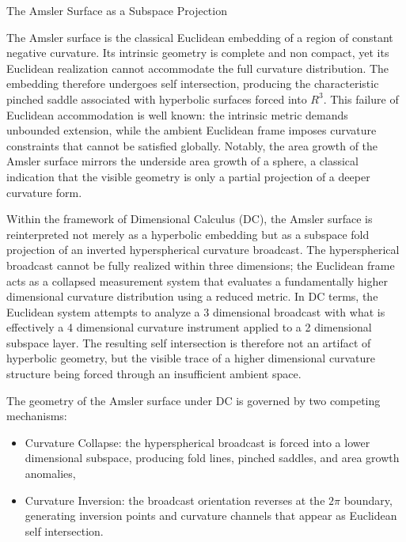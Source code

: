 \documentclass[final,onefignum,onetabnum]{siamart}
\begin{document}
\begin{section}{The Amsler Surface as a Subspace Projection}

The Amsler surface is the classical Euclidean embedding of a region of constant negative curvature. Its intrinsic geometry is complete and non compact, yet its Euclidean realization cannot accommodate the full curvature distribution. The embedding therefore undergoes self intersection, producing the characteristic pinched saddle associated with hyperbolic surfaces forced into $R^3$. This failure of Euclidean accommodation is well known: the intrinsic metric demands unbounded extension, while the ambient Euclidean frame imposes curvature constraints that cannot be satisfied globally. Notably, the area growth of the Amsler surface mirrors the underside area growth of a sphere, a classical indication that the visible geometry is only a partial projection of a deeper curvature form.

Within the framework of Dimensional Calculus (DC), the Amsler surface is reinterpreted not merely as a hyperbolic embedding but as a subspace fold projection of an inverted hyperspherical curvature broadcast. The hyperspherical broadcast cannot be fully realized within three dimensions; the Euclidean frame acts as a collapsed measurement system that evaluates a fundamentally higher dimensional curvature distribution using a reduced metric. In DC terms, the Euclidean system attempts to analyze a 3 dimensional broadcast with what is effectively a 4 dimensional curvature instrument applied to a 2 dimensional subspace layer. The resulting self intersection is therefore not an artifact of hyperbolic geometry, but the visible trace of a higher dimensional curvature structure being forced through an insufficient ambient space.

The geometry of the Amsler surface under DC is governed by two competing mechanisms:

\begin{itemize}
    \item Curvature Collapse: the hyperspherical broadcast is forced into a lower dimensional subspace, producing fold lines, pinched saddles, and area growth anomalies,
    \item Curvature Inversion: the broadcast orientation reverses at the $2\pi$ boundary, generating inversion points and curvature channels that appear as Euclidean self intersection.
    \end{itemize}
    

\end{section}
\end{document}
